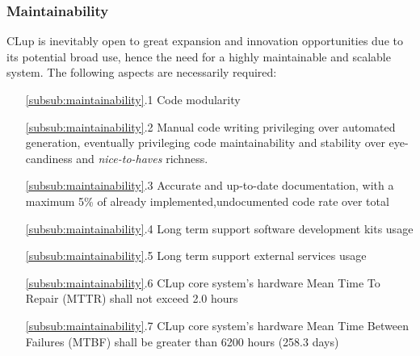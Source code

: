 \subsubsection{Maintainability \label{subsub:maintainability}}
CLup is inevitably open to great expansion and innovation opportunities due to its potential broad use, hence the need for a highly maintainable and scalable system.
The following aspects are necessarily required:\newline
\begin{itemize}[leftmargin=+.8in]
    \item[\ref{subsub:maintainability}.1] Code modularity
    \item[\ref{subsub:maintainability}.2] Manual code writing privileging over automated generation, eventually privileging code maintainability and stability over eye-candiness and \textit{nice-to-haves} richness.
    \item[\ref{subsub:maintainability}.3] Accurate and up-to-date documentation, with a maximum 5\% of already implemented,undocumented code rate over total
    \item[\ref{subsub:maintainability}.4] Long term support software development kits usage
    \item[\ref{subsub:maintainability}.5] Long term support external services usage
    \item[\ref{subsub:maintainability}.6] CLup core system's hardware Mean Time To Repair (MTTR) shall not exceed 2.0 hours
    \item[\ref{subsub:maintainability}.7] CLup core system's hardware Mean Time Between Failures (MTBF) shall be greater than 6200 hours (258.3 days)

\end{itemize}


